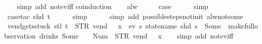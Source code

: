 \begin{isabellebody}
%
\isadelimproof
\ \ %
\endisadelimproof
%
\isatagproof
{}\isamarkupfalse%
\ {\isacharparenleft}simp\ add{\isacharcolon}\ not{\isacharunderscore}ev{\isacharunderscore}iff{\isacharparenright}\isanewline
{}\isamarkupfalse%
{\isacharparenleft}coinduction{\isacharparenright}\isanewline
\ \ \isamarkupfalse%
\ alw\isanewline
\ \ \isamarkupfalse%
\ \isamarkupfalse%
\ {\isacharquery}case\isanewline
\ \ \ \ \isamarkupfalse%
\ simp\isanewline
\ \ \ \ \isamarkupfalse%
\ {\isacharparenleft}case{\isacharunderscore}tac\ {\isachardoublequoteopen}shd\ t{\isachardoublequoteclose}{\isacharparenright}\isanewline
\ \ \ \ \isamarkupfalse%
\ simp\isanewline
\ \ \ \ \isamarkupfalse%
\ {\isacharparenleft}simp\ add{\isacharcolon}\ possible{\isacharunderscore}steps{\isacharunderscore}not{\isacharunderscore}init\ alw{\isacharunderscore}not{\isacharunderscore}some{\isacharparenright}\isanewline
{}\isamarkupfalse%
%
\endisatagproof
{\isafoldproof}%
%
\isadelimproof
\isanewline
%
\endisadelimproof
\isanewline
{}\isamarkupfalse%
\ vend{\isacharunderscore}gets{\isacharunderscore}stuck{\isacharcolon}\ {\isachardoublequoteopen}stl\ t\ {\isacharequal}\ {\isacharparenleft}STR\ {\isacharprime}{\isacharprime}vend{\isacharprime}{\isacharprime}{\isacharcomma}\ {\isacharbrackleft}{\isacharbrackright}{\isacharparenright}\ {\isacharhash}{\isacharhash}\ x{}\ {\isasymLongrightarrow}\ {\isasymnot}ev\ {\isacharparenleft}{\isasymlambda}s{\isachardot}\ statename\ {\isacharparenleft}shd\ s{\isacharparenright}\ {\isacharequal}\ Some\ {}{\isacharparenright}\ {\isacharparenleft}make{\isacharunderscore}full{\isacharunderscore}observation\ drinks\ {\isacharparenleft}Some\ {}{\isacharparenright}\ {\isacharparenleft}{\isacharless}{\isachargreater}{\isacharparenleft}{}\ {\isacharcolon}{\isacharequal}\ Num\ {}{\isacharparenright}{\isacharparenright}\ {\isacharparenleft}{\isacharparenleft}STR\ {\isacharprime}{\isacharprime}vend{\isacharprime}{\isacharprime}{\isacharcomma}\ {\isacharbrackleft}{\isacharbrackright}{\isacharparenright}\ {\isacharhash}{\isacharhash}\ x{}{\isacharparenright}{\isacharparenright}{\isachardoublequoteclose}\isanewline
%
\isadelimproof
\ \ %
\endisadelimproof
%
\isatagproof
{}\isamarkupfalse%
\ {\isacharparenleft}simp\ add{\isacharcolon}\ not{\isacharunderscore}ev{\isacharunderscore}iff{\isacharparenright}\isanewline
{}\isamarkupfalse%

\end{isabellebody}
